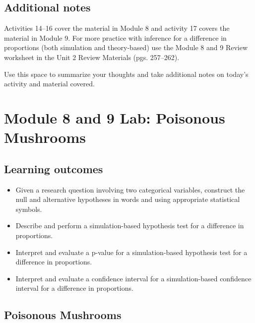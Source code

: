 \documentclass[
]{report}
\begin{document}
\subsection{Additional notes}\label{additional-notes-16}

Activities 14--16 cover the material in Module 8 and activity 17 covers the material in Module 9. For more practice with inference for a difference in proportions (both simulation and theory-based) use the Module 8 and 9 Review worksheet in the Unit 2 Review Materials (pgs. 257--262).

Use this space to summarize your thoughts and take additional notes on today's activity and material covered.

\newpage

\section{Module 8 and 9 Lab: Poisonous Mushrooms}\label{module-8-and-9-lab-poisonous-mushrooms}


\subsection{Learning outcomes}\label{learning-outcomes-19}

\begin{itemize}
\item
  Given a research question involving two categorical variables, construct the null and alternative hypotheses
  in words and using appropriate statistical symbols.
\item
  Describe and perform a simulation-based hypothesis test for a difference in proportions.
\item
  Interpret and evaluate a p-value for a simulation-based hypothesis test for a difference in proportions.
\item
  Interpret and evaluate a confidence interval for a simulation-based confidence interval for a difference in proportions.
\end{itemize}

\subsection{Poisonous Mushrooms}\label{poisonous-mushrooms}
\end{document}
